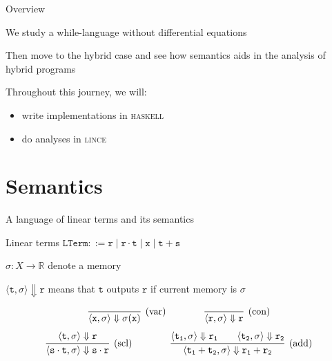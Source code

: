 \documentclass{beamer}
\begin{document}
\begin{frame}{Overview}

        We study a while-language without differential equations

        \bigskip
        Then move to the hybrid case and see how semantics aids in the analysis
        of hybrid programs

        \bigskip
        Throughout this journey, we will:
        \begin{itemize}
                \item write implementations in \textsc{haskell}
                \item do analyses in \textsc{lince}
        \end{itemize}
\end{frame}

\section{Semantics}

\begin{frame}{A language of linear terms and its semantics}

        \begin{block}{Linear terms}
	$\mathtt{LTerm} ::= \mathtt{r} \mid \mathtt{r \cdot t}
        \mid \mathtt{x}  \mid \mathtt{t + s }$
	\end{block}

        $\sigma : X \to \mathbb{R}$ denote a \alert{memory}

        $\langle \mathtt{t},\sigma \rangle \Downarrow \mathtt{r}$
        means that $\mathtt{t}$ outputs $\mathtt{r}$ if current memory is
        $\sigma$

        \[
                \infer[(\text{var})]{\langle \mathtt{x}, \sigma \rangle 
                \Downarrow \sigma(\mathtt{x})}{} \qquad \qquad
                \infer[(\text{con})]{\langle \mathtt{r}, \sigma \rangle 
                \Downarrow \mathtt{r}}{}
        \] \vspace{0.1cm}        
        \[        
                \infer[(\text{scl})]{  
                        \langle \mathtt{s} \cdot \mathtt{t}, \sigma \rangle \Downarrow 
                        \mathtt{s \cdot r}
                        }{
                        \langle \mathtt{t}, \sigma \rangle \Downarrow \mathtt{r}
                } \qquad \qquad
                \infer[(\text{add})]{  
                        \langle \mathtt{t_1} + \mathtt{t_2}, \sigma \rangle \Downarrow 
                        \mathtt{r_1 + r_2}
                        }{
                        \langle \mathtt{t_1}, \sigma \rangle \Downarrow \mathtt{r_1} \qquad
                        \langle \mathtt{t_2}, \sigma \rangle \Downarrow \mathtt{r_2}
                }
        \]
\end{frame}        
\end{document}
